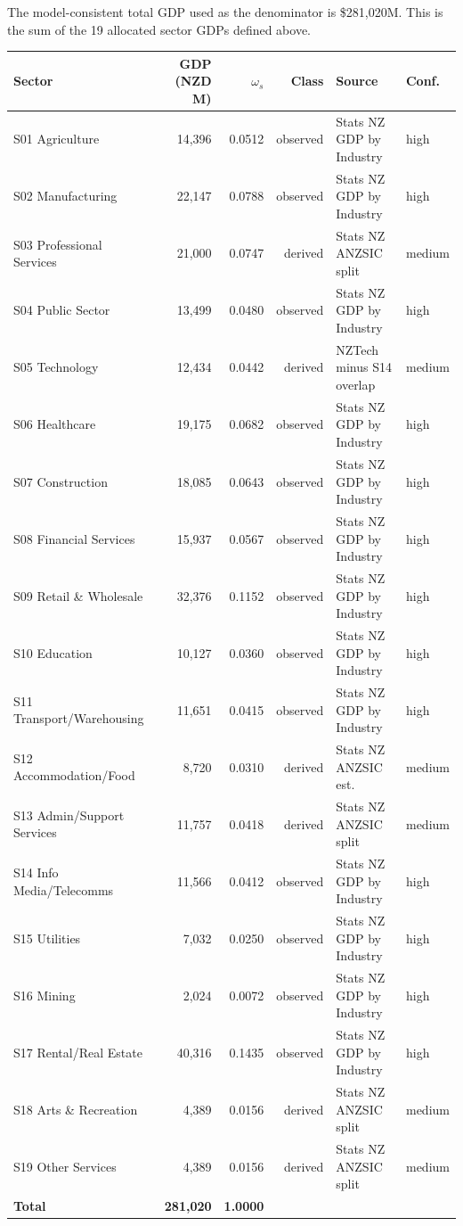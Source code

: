 \documentclass[11pt,a4paper]{article}
\begin{document}
The model-consistent total GDP used as the denominator is \$281,020M. This is the sum of the 19 allocated sector GDPs defined above.

\begin{center}
\begin{longtable}{lrrrll}
\toprule
Sector & GDP (NZD M) & $\omega_s$ & Class & Source & Conf.\\
\midrule
\endhead
S01 Agriculture & 14,396 & 0.0512 & observed & Stats NZ GDP by Industry & high \\
S02 Manufacturing & 22,147 & 0.0788 & observed & Stats NZ GDP by Industry & high \\
S03 Professional Services & 21,000 & 0.0747 & derived & Stats NZ ANZSIC split & medium \\
S04 Public Sector & 13,499 & 0.0480 & observed & Stats NZ GDP by Industry & high \\
S05 Technology & 12,434 & 0.0442 & derived & NZTech minus S14 overlap & medium \\
S06 Healthcare & 19,175 & 0.0682 & observed & Stats NZ GDP by Industry & high \\
S07 Construction & 18,085 & 0.0643 & observed & Stats NZ GDP by Industry & high \\
S08 Financial Services & 15,937 & 0.0567 & observed & Stats NZ GDP by Industry & high \\
S09 Retail \& Wholesale & 32,376 & 0.1152 & observed & Stats NZ GDP by Industry & high \\
S10 Education & 10,127 & 0.0360 & observed & Stats NZ GDP by Industry & high \\
S11 Transport/Warehousing & 11,651 & 0.0415 & observed & Stats NZ GDP by Industry & high \\
S12 Accommodation/Food & 8,720 & 0.0310 & derived & Stats NZ ANZSIC est.\ & medium \\
S13 Admin/Support Services & 11,757 & 0.0418 & derived & Stats NZ ANZSIC split & medium \\
S14 Info Media/Telecomms & 11,566 & 0.0412 & observed & Stats NZ GDP by Industry & high \\
S15 Utilities & 7,032 & 0.0250 & observed & Stats NZ GDP by Industry & high \\
S16 Mining & 2,024 & 0.0072 & observed & Stats NZ GDP by Industry & high \\
S17 Rental/Real Estate & 40,316 & 0.1435 & observed & Stats NZ GDP by Industry & high \\
S18 Arts \& Recreation & 4,389 & 0.0156 & derived & Stats NZ ANZSIC split & medium \\
S19 Other Services & 4,389 & 0.0156 & derived & Stats NZ ANZSIC split & medium \\
\midrule
\textbf{Total} & \textbf{281,020} & \textbf{1.0000} & & & \\
\bottomrule
\end{longtable}
\end{center}
\end{document}

